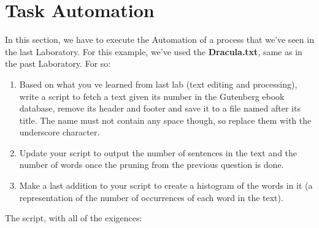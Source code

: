 \documentclass[a4paper, 12pt]{article}
\begin{document}
\section{Task Automation}
In this section, we have to execute the Automation of a process that we've seen in the last Laboratory.
For this example, we've used the \textbf{Dracula.txt}, same as in the past Laboratory. For so:

\begin{enumerate}
    \item Based on what you ve learned from last lab (text editing and processing), write a script to fetch a text given its number in the Gutenberg ebook database, remove its header and footer and save it to a file named after its title. The name must not contain any space though, so replace them with the underscore character.
    \item Update your script to output the number of sentences in the text and the number of words once the pruning from the previous question is done.
    \item Make a last addition to your script to create a histogram of the words in it (a representation of the number of occurrences of each word in the text).
\end{enumerate}

The script, with all of the exigences:
\end{document}
